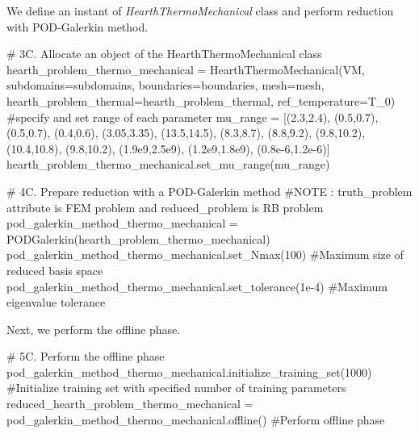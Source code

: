 We define an instant of \emph{HearthThermoMechanical} class and perform reduction with POD-Galerkin method.
\begin{python}
# 3C. Allocate an object of the HearthThermoMechanical class
hearth_problem_thermo_mechanical = HearthThermoMechanical(VM, subdomains=subdomains, boundaries=boundaries, mesh=mesh, hearth_problem_thermal=hearth_problem_thermal, ref_temperature=T_0)
#specify and set range of each parameter
mu_range = [(2.3,2.4), (0.5,0.7), (0.5,0.7), (0.4,0.6), (3.05,3.35), (13.5,14.5), (8.3,8.7), (8.8,9.2), (9.8,10.2), (10.4,10.8), (9.8,10.2), (1.9e9,2.5e9), (1.2e9,1.8e9), (0.8e-6,1.2e-6)]
hearth_problem_thermo_mechanical.set_mu_range(mu_range)

# 4C. Prepare reduction with a POD-Galerkin method
#NOTE : truth_problem attribute is FEM problem and reduced_problem is RB problem
pod_galerkin_method_thermo_mechanical = PODGalerkin(hearth_problem_thermo_mechanical)
pod_galerkin_method_thermo_mechanical.set_Nmax(100) #Maximum size of reduced basis space
pod_galerkin_method_thermo_mechanical.set_tolerance(1e-4) #Maximum eigenvalue tolerance
\end{python}

Next, we perform the offline phase.
\begin{python}
# 5C. Perform the offline phase
pod_galerkin_method_thermo_mechanical.initialize_training_set(1000) #Initialize training set with specified number of training parameters
reduced_hearth_problem_thermo_mechanical = pod_galerkin_method_thermo_mechanical.offline() #Perform offline phase
\end{python}

